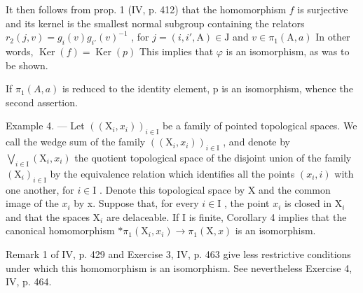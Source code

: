 It then follows from prop. 1 (IV, p. 412) that the homomorphism \(f\) is surjective and its kernel is the smallest normal subgroup containing the relators \(r_2(j,v) = g_i(v)g_{i'}(v)^{-1}\) , for \(j = (i,i',\mathrm{A}) \in \mathrm{J}\) and \(v \in \pi_1(\mathrm{A},a)\) In other words, \(\operatorname{Ker}(f) = \operatorname{Ker}(p)\) This implies that \(\varphi\) is an isomorphism, as was to be shown.

If \(\pi_{1}(A,a)\) is reduced to the identity element, p is an isomorphism, whence the second assertion.

Example 4. — Let \(((\mathrm{X}_{i}, x_{i}))_{i \in \mathrm{I}}\) be a family of pointed topological spaces. We call the wedge sum of the family \(((\mathrm{X}_{i}, x_{i}))_{i \in \mathrm{I}}\) , and denote by \(\bigvee_{i \in \mathrm{I}} (\mathrm{X}_{i}, x_{i})\) the quotient topological space of the disjoint union of the family \((\mathrm{X}_{i})_{i \in \mathrm{I}}\) by the equivalence relation which identifies all the points \((x_{i}, i)\) with one another, for \(i \in \mathrm{I}\) . Denote this topological space by X and the common image of the \(x_{i}\) by x. Suppose that, for every \(i \in \mathrm{I}\) , the point \(x_{i}\) is closed in \(\mathrm{X}_{i}\) and that the spaces \(\mathrm{X}_{i}\) are delaceable. If I is finite, Corollary 4 implies that the canonical homomorphism \(* \pi_{1}(\mathrm{X}_{i}, x_{i}) \to \pi_{1}(\mathrm{X}, x)\) is an isomorphism.

Remark 1 of IV, p. 429 and Exercise 3, IV, p. 463 give less restrictive conditions under which this homomorphism is an isomorphism. See nevertheless Exercise 4, IV, p. 464.

